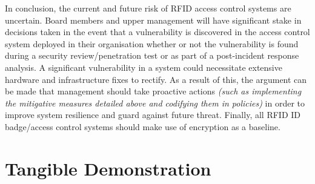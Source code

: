 \noindent In conclusion, the current and future risk of RFID access control systems are uncertain. Board members and upper management will have significant stake in decisions taken in the event that a vulnerability is discovered in the access control system deployed in their organisation whether or not the vulnerability is found during a security review/penetration test or as part of a post-incident response analysis. A significant vulnerability in a system could necessitate extensive hardware and infrastructure fixes to rectify. As a result of this, the argument can be made that management should take proactive actions \textit{(such as implementing the mitigative measures detailed above and codifying them in policies)} in order to improve system resilience and guard against future threat. Finally, all RFID ID badge/access control systems should make use of encryption as a baseline.


\section{Tangible Demonstration}
